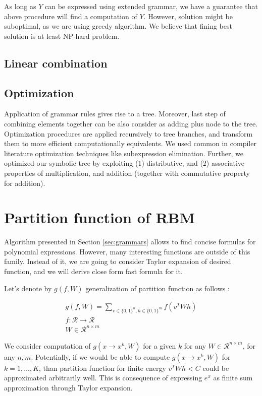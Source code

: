 \documentclass{article}
\begin{document}
As long as $Y$ can be expressed using extended grammar, we have a guarantee that above procedure will find a computation of $Y$. However, solution might be suboptimal, as we are using
greedy algorithm. We believe that fining best solution is at least NP-hard problem. 

\subsection{Linear combination}

\subsection{Optimization}

Application of grammar rules gives rise to a tree. Moreover, last step of combining elements together can be also consider as adding plus node to the tree. Optimization procedures
are applied recursively to tree branches, and transform them to more efficient computationally equivalents. We used common in compiler literature 
optimization techniques like subexpression elimination. Further, we optimized our symbolic tree by exploiting (1) distributive, and (2) associative properties of multiplication, and addition (together with commutative property for addition).


\section{Partition function of RBM}
Algorithm presented in Section \ref{sec:grammars} allows to find concise formulas for polynomial expressions. However, many interesting functions are outside of this family. 
Instead of it, we are going to consider Taylor expansion of desired function, and we will derive close form fast formula for it.

Let's denote by $g(f, W)$ generalization of partition function as follows : 

\begin{gather*}
g(f, W) = \sum_{v \in \{0, 1\}^n, h \in \{0, 1\}^m} f(v^TWh) \\
f : \mathcal{R} \rightarrow \mathcal{R}\\
W \in \mathcal{R}^{n \times m}
\end{gather*}

We consider computation of $g(x \rightarrow x^k, W)$ for a given $k$ for any $W \in \mathcal{R}^{n \times m}$, for any $n, m$. Potentially, if we
would be able to compute $g(x \rightarrow x^k, W)$ for $k = 1, \dots, K$, than partition function for finite energy $v^TWh < C$ could be
approximated arbitrarily well. This is consequence of expressing $e^{x}$ as finite sum approximation through Taylor expansion.
\end{document}
